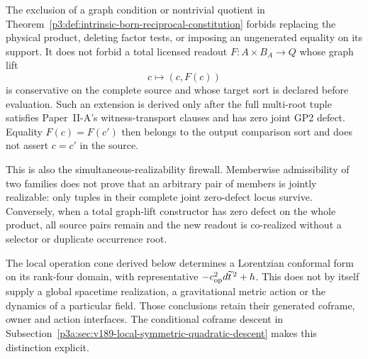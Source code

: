 \documentclass[12pt,a4paper]{article}
\begin{document}
\begin{remark}
\label{p3a:rem:relation-free-readout-firewall}
The exclusion of a graph condition or nontrivial quotient in
Theorem~\ref{p3:def:intrinsic-born-reciprocal-constitution} forbids replacing the
physical product, deleting factor tests, or imposing an ungenerated equality
on its support.  It does not forbid a total licensed readout
\(F:A\times B_A\to Q\) whose graph lift
\[
 c\longmapsto(c,F(c))
\]
is conservative on the complete source and whose target sort is declared
before evaluation.  Such an extension is derived only after the full
multi-root tuple satisfies Paper~II-A's witness-transport clauses and has zero
joint GP2 defect.  Equality \(F(c)=F(c')\) then belongs to the output
comparison sort and does not assert \(c=c'\) in the source.

This is also the simultaneous-realizability firewall.  Memberwise admissibility
of two families does not prove that an arbitrary pair of members is jointly
realizable: only tuples in their complete joint zero-defect locus survive.
Conversely, when a total graph-lift constructor has zero defect on the whole
product, all source pairs remain and the new readout is co-realized without a
selector or duplicate occurrence root.
\end{remark}

\begin{remark}
\label{p3:rem:born-reciprocity-lorentzian-recovery}
The local operation cone derived below determines a Lorentzian conformal
form on its rank-four domain, with representative
\(-c_{\rm op}^2d\widetilde t^{\,2}+h\). This does not by itself
supply a global spacetime realization, a gravitational metric action or the
dynamics of a particular field. Those conclusions retain their generated
coframe, owner and action interfaces. The conditional coframe descent in
Subsection~\ref{p3a:sec:v189-local-symmetric-quadratic-descent} makes this
distinction explicit.
\end{remark}
\end{document}
